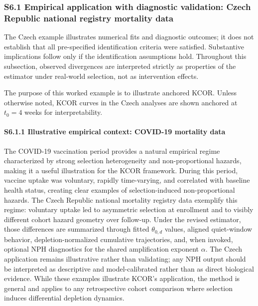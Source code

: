 \documentclass[
]{article}
\begin{document}
\subsubsection{S6.1 Empirical application with diagnostic validation: Czech Republic national registry mortality data}\label{s6.1-empirical-application-with-diagnostic-validation-czech-republic-national-registry-mortality-data}

The Czech example illustrates numerical fits and diagnostic outcomes; it does not establish that all pre-specified identification criteria were satisfied. Substantive implications follow only if the identification assumptions hold. Throughout this subsection, observed divergences are interpreted strictly as properties of the estimator under real-world selection, not as intervention effects.

The purpose of this worked example is to illustrate anchored KCOR. Unless otherwise noted, KCOR curves in the Czech analyses are shown anchored at \(t_0 = 4\) weeks for interpretability.

\paragraph{S6.1.1 Illustrative empirical context: COVID-19 mortality data}\label{s6.1.1-illustrative-empirical-context-covid-19-mortality-data}

The COVID-19 vaccination period provides a natural empirical regime characterized by strong selection heterogeneity and non-proportional hazards, making it a useful illustration for the KCOR framework. During this period, vaccine uptake was voluntary, rapidly time-varying, and correlated with baseline health status, creating clear examples of selection-induced non-proportional hazards. The Czech Republic national mortality registry data exemplify this regime: voluntary uptake led to asymmetric selection at enrollment and to visibly different cohort hazard geometry over follow-up. Under the revised estimator, those differences are summarized through fitted \(\theta_{0,d}\) values, aligned quiet-window behavior, depletion-normalized cumulative trajectories, and, when invoked, optional NPH diagnostics for the shared amplification exponent \(\alpha\). The Czech application remains illustrative rather than validating; any NPH output should be interpreted as descriptive and model-calibrated rather than as direct biological evidence. While these examples illustrate KCOR's application, the method is general and applies to any retrospective cohort comparison where selection induces differential depletion dynamics.
\end{document}
